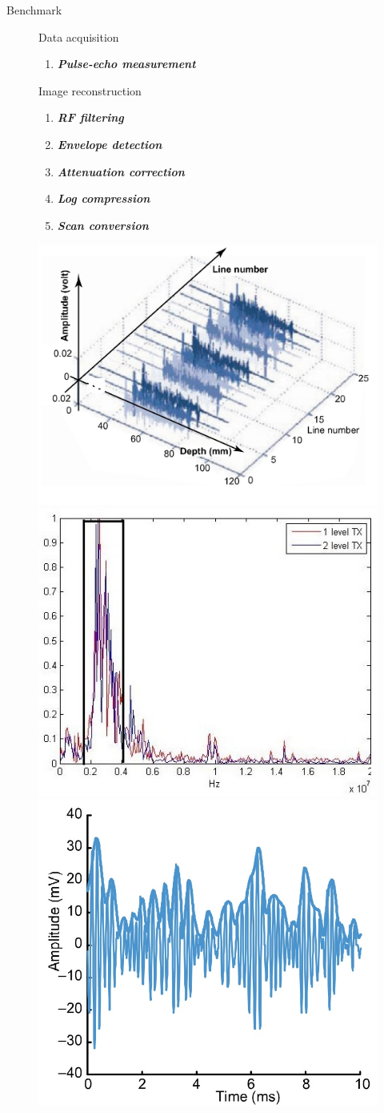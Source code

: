 \documentclass[t,12pt,english
\ifx\beamermode\undefined\else,\beamermode\fi
]{beamer}
\begin{document}
\begin{frame}{Benchmark}


\begin{figure}[!htb]

\begin{block}{\footnotesize{Data acquisition}}\tiny{}
\begin{enumerate} 
\vspace{0.05cm}
    
     \item \tiny{\textbf{\textit{Pulse-echo measurement}}}
\end{enumerate}
\end{block}

\begin{block}{\footnotesize{Image reconstruction}}\tiny{}
\begin{enumerate} 
\vspace{0.05cm}
     \color{red}
     \item \tiny{\textbf{\textit{RF filtering}}}
     \item \tiny{\textbf{\textit{Envelope detection}}}
     \item \tiny{\textbf{\textit{Attenuation correction}}}
     \item \tiny{\textbf{\textit{Log compression}}}
     \item \tiny{\textbf{\textit{Scan conversion}}}
\end{enumerate}
\end{block}
\endminipage
{}
\centering
\includegraphics[width=.31\textwidth]{27.jpg}\\
\includegraphics[width=.31\textwidth]{6-1.jpg}\\
\includegraphics[width=.31\textwidth]{7.jpg}\\

\endminipage


\end{figure}

\end{frame}
\end{document}
